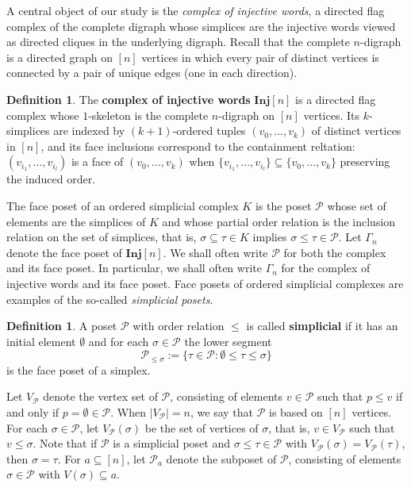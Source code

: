 \documentclass[a4paper,11pt]{article}
\theoremstyle{definition}
\newtheorem{definition}[theorem]{Definition}
\newcommand{\inj}{\mathbf{Inj}}
\newcommand{\PP}{\mathcal{P}}
\begin{document}
A central object of our study is the \emph{complex of injective words}, a directed flag complex of the complete digraph whose simplices are the injective words viewed as directed cliques in the underlying digraph. Recall that the complete $n$-digraph is a directed graph on $[n]$ vertices in which every pair of distinct vertices is connected by a pair of unique edges (one in each direction). 

\begin{definition} 
    The \textbf{complex of injective words} $\inj[n]$ is a directed flag complex whose $1$-skeleton is the complete $n$-digraph on $[n]$ vertices. Its $k$-simplices are indexed by $(k+1)$-ordered tuples $(v_0, \ldots, v_k)$ of distinct vertices in $[n]$, and its face inclusions correspond to the containment reltation: $(v_{i_1}, \ldots, v_{i_l})$ is a face of $(v_0, \ldots, v_k)$ when $\{v_{i_1}, \ldots, v_{i_l}\} \subseteq \{v_0, \ldots, v_k\}$ preserving the induced order.
\end{definition}

The face poset of an ordered simplicial complex $K$ is the poset $\PP$ whose set of elements are the simplices of $K$ and whose partial order relation is the inclusion relation on the set of simplices, that is, $\sigma \subseteq \tau \in K$ implies $\sigma \leq \tau \in \PP$. Let $\Gamma_n$ denote the face poset of $\inj[n]$. We shall often write $\PP$ for both the complex and its face poset. In particular, we shall often write $\Gamma_n$ for the complex of injective words and its face poset. Face posets of ordered simplicial complexes are examples of the so-called \emph{simplicial posets}. 

\begin{definition}
A poset $\PP$ with order relation $\leq$ is called \textbf{simplicial} if it has an initial element $\emptyset$ and for each $\sigma \in \PP$ the lower segment 
\[
\PP_{\leq \sigma} := \{\tau \in \PP: \emptyset \leq \tau \leq \sigma\}
\]
is the face poset of a simplex.
\end{definition}

Let $V_\PP$ denote the vertex set of $\PP$, consisting  of elements $v \in \PP$ such that $p \leq v$ if and only if $p = \emptyset \in \PP$. When $|V_\PP| =n $, we say that $\PP$ is based on $[n]$ vertices. For each $\sigma \in \PP$, let $V_\PP(\sigma)$ be the set of vertices of $\sigma$, that is,  $v \in V_\PP$ such that $v \leq \sigma$. Note that if $\PP$ is a simplicial poset and $\sigma \leq \tau \in \PP$ with $V_\PP(\sigma) = V_\PP(\tau)$, then $\sigma=\tau$. For $a \subseteq [n]$, let $\PP_a$ denote the subposet of $\PP$, consisting of elements $\sigma \in \PP$ with $V(\sigma) \subseteq a$.
\end{document}
